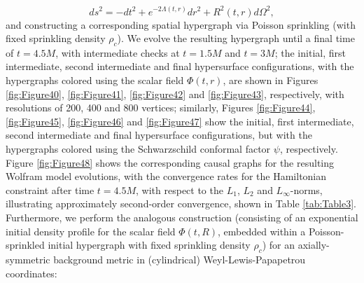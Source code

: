 \documentclass{article}
\begin{document}
\begin{equation}
d s^2 = - d t^2 + e^{-2 \Lambda \left( t, r \right)} d r^2 + R^2 \left( t, r \right) d \Omega^2,
\end{equation}
and constructing a corresponding spatial hypergraph via Poisson sprinkling (with fixed sprinkling density ${\rho_c}$). We evolve the resulting hypergraph until a final time of ${t = 4.5 M}$, with intermediate checks at ${t = 1.5 M}$ and ${t = 3 M}$; the initial, first intermediate, second intermediate and final hypersurface configurations, with the hypergraphs colored using the scalar field ${\Phi \left( t,r \right)}$, are shown in Figures \ref{fig:Figure40}, \ref{fig:Figure41}, \ref{fig:Figure42} and \ref{fig:Figure43}, respectively, with resolutions of 200, 400 and 800 vertices; similarly, Figures \ref{fig:Figure44}, \ref{fig:Figure45}, \ref{fig:Figure46} and \ref{fig:Figure47} show the initial, first intermediate, second intermediate and final hypersurface configurations, but with the hypergraphs colored using the Schwarzschild conformal factor ${\psi}$, respectively. Figure \ref{fig:Figure48} shows the corresponding causal graphs for the resulting Wolfram model evolutions, with the convergence rates for the Hamiltonian constraint after time ${t = 4.5 M}$, with respect to the ${L_1}$, ${L_2}$ and ${L_{\infty}}$-norms, illustrating approximately second-order convergence, shown in Table \ref{tab:Table3}. Furthermore, we perform the analogous construction (consisting of an exponential initial density profile for the scalar field ${\Phi \left( t, R \right)}$, embedded within a Poisson-sprinkled initial hypergraph with fixed sprinkling density ${\rho_c}$) for an axially-symmetric background metric in (cylindrical) Weyl-Lewis-Papapetrou coordinates:
\end{document}
